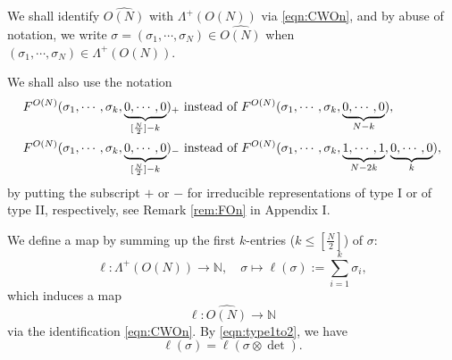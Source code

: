 We shall identify $\widehat{O(N)}$
 with $\Lambda^+(O(N))$ via \eqref{eqn:CWOn}, 
 and by abuse of notation, 
 we write $\sigma =(\sigma_1, \cdots, \sigma_N)\in \widehat{O(N)}$
 when $(\sigma_1, \cdots, \sigma_N)\in\Lambda^+(O(N))$.  

\begin{remark}
We shall also use the notation
\begin{align*}
&F^{{O(N)}}({\sigma_1, \cdots, \sigma_k, \underbrace{0,\cdots,0}_{[\frac N2]-k}})_+
\text{ instead of }
 F^{{O(N)}}({\sigma_1, \cdots, \sigma_k, \underbrace{0,\cdots,0}_{N-k}}), 
\\
&F^{{O(N)}}({\sigma_1, \cdots, \sigma_k, \underbrace{0,\cdots,0}_{[\frac N2]-k}})_-
\text{ instead of }
 F^{{O(N)}}({\sigma_1, \cdots, \sigma_k, \underbrace{1, \cdots,1}_{N-2k},\underbrace{0,\cdots,0}_{k}}), 
\end{align*}
 by putting the subscript $+$ or $-$
 for irreducible representations of type I
 or of type II,
respectively, 
 see Remark \ref{rem:FOn} in Appendix I.  
\end{remark}
We define a map by summing up 
the first $k$-entries 
 ($k \le [\frac N 2]$) of $\sigma$:
\begin{equation}
\label{eqn:ONlength}
\ell \colon
\Lambda^+(O(N)) \to {\mathbb{N}}, 
\quad
\sigma
\mapsto 
\ell(\sigma):=\sum_{i=1}^{k}\sigma_i, 
\end{equation}
which induces a map
\[
  \ell \colon \widehat {O(N)} \to {\mathbb{N}}
\]
via the identification \eqref{eqn:CWOn}.  
By \eqref{eqn:type1to2}, 
 we have 
\begin{equation}
\label{eqn:lsigma}
\ell(\sigma)=\ell(\sigma \otimes \det).  
\end{equation}




